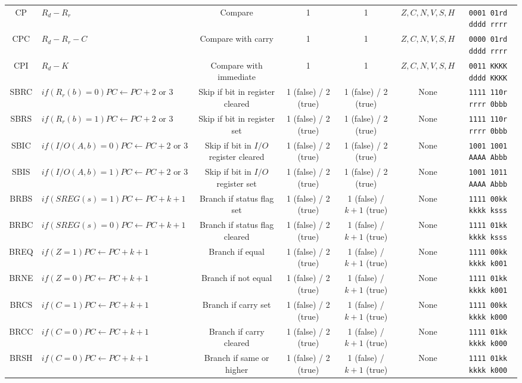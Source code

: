 \documentclass[11pt]{article}
\begin{document}
\begin{center}
\begin{longtable}{|c|m{12em}|c|c|c|c|c|}
CP & $R_d - R_r$ & Compare & 1 & 1 & $Z, C, N, V, S, H$ & \texttt{0001 01rd dddd rrrr}\\
CPC & $ R_d - R_r - C$ & Compare with carry & 1 & 1 & $Z, C, N, V, S, H$ & \texttt{0000 01rd dddd rrrr}\\
CPI & $R_d - K$ & Compare with immediate & 1 & 1 & $Z, C, N, V, S, H$ & \texttt{0011 KKKK dddd KKKK}\\
SBRC & $if(R_r(b) = 0) PC \leftarrow PC + 2 \text{ or } 3$ & Skip if bit in register cleared & 1 (false) / 2 (true) & 1 (false) / 2 (true) & None & \texttt{1111 110r rrrr 0bbb}\\
SBRS & $if(R_r(b) = 1) PC \leftarrow PC + 2 \text{ or } 3$ & Skip if bit in register set & 1 (false) / 2 (true) & 1 (false) / 2 (true) & None & \texttt{1111 110r rrrr 0bbb}\\
SBIC & $if(I/O(A, b) = 0) PC \leftarrow PC + 2 \text{ or } 3$ & Skip if bit in $I/O$ register cleared & 1 (false) / 2 (true) & 1 (false) / 2 (true) & None & \texttt{1001 1001 AAAA Abbb}\\
SBIS & $if(I/O(A, b) = 1) PC \leftarrow PC +2 \text{ or } 3$ & Skip if bit in $I/O$ register set & 1 (false) / 2 (true) & 1 (false) / 2 (true) & None & \texttt{1001 1011 AAAA Abbb}\\
BRBS & $if(SREG(s) = 1) PC \leftarrow PC + k + 1$ & Branch if status flag set & 1 (false) / 2 (true) & 1 (false) / $k + 1$ (true) & None & \texttt{1111 00kk kkkk ksss}\\
BRBC & $if(SREG(s) = 0) PC \leftarrow PC + k + 1$ & Branch if status flag cleared & 1 (false) / 2 (true) & 1 (false) / $k+1$ (true) & None & \texttt{1111 01kk kkkk ksss}\\
BREQ & $if(Z = 1) PC \leftarrow PC + k + 1$ & Branch if equal & 1 (false) / 2 (true) & 1 (false) / $k+1$ (true) & None & \texttt{1111 00kk kkkk k001}\\
BRNE & $if(Z = 0) PC \leftarrow PC + k + 1$ & Branch if not equal & 1 (false) / 2 (true) & 1 (false) / $k+1$ (true) & None & \texttt{1111 01kk kkkk k001}\\
BRCS & $if(C = 1) PC \leftarrow PC + k + 1$ & Branch if carry set & 1 (false) / 2 (true) & 1 (false) / $k+1$ (true) & None & \texttt{1111 00kk kkkk k000}\\
BRCC & $if(C = 0) PC \leftarrow PC + k + 1$ & Branch if carry cleared & 1 (false) / 2 (true) & 1 (false) / $k+1$ (true) & None & \texttt{1111 01kk kkkk k000}\\
BRSH & $if(C = 0) PC \leftarrow PC + k + 1$ & Branch if same or higher & 1 (false) / 2 (true) & 1 (false) / $k+1$ (true) & None & \texttt{1111 01kk kkkk k000}\\

\end{longtable}
\end{center}
\end{document}
